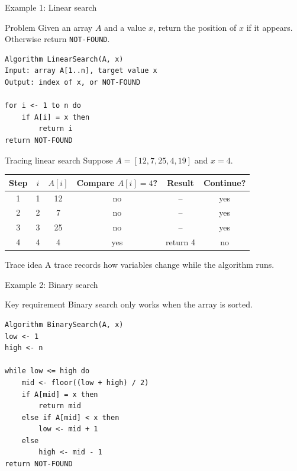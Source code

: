 \documentclass[aspectratio=43,10pt]{beamer}
\begin{document}
\begin{frame}[fragile]{Example 1: Linear search}
\begin{block}{Problem}
Given an array $A$ and a value $x$, return the position of $x$ if it appears. Otherwise return \texttt{NOT-FOUND}.
\end{block}

\begin{lstlisting}[style=pseudo]
Algorithm LinearSearch(A, x)
Input: array A[1..n], target value x
Output: index of x, or NOT-FOUND

for i <- 1 to n do
    if A[i] = x then
        return i
return NOT-FOUND
\end{lstlisting}
\end{frame}

\begin{frame}{Tracing linear search}
  Suppose $A = [12, 7, 25, 4, 19]$ and $x = 4$.

  \vspace{0.6em}
  \begin{center}
  \begin{tabular}{cccccc}
    \toprule
    Step & $i$ & $A[i]$ & Compare $A[i]=4$? & Result & Continue? \\
    \midrule
    1 & 1 & 12 & no & -- & yes \\
    2 & 2 & 7  & no & -- & yes \\
    3 & 3 & 25 & no & -- & yes \\
    4 & 4 & 4  & yes & return 4 & no \\
    \bottomrule
  \end{tabular}
  \end{center}

  \vspace{0.8em}
  \begin{block}{Trace idea}
    A trace records how variables change while the algorithm runs.
  \end{block}
\end{frame}

\begin{frame}[fragile]{Example 2: Binary search}
\begin{block}{Key requirement}
Binary search only works when the array is sorted.
\end{block}

\begin{lstlisting}[style=pseudo,basicstyle=\ttfamily\scriptsize]
Algorithm BinarySearch(A, x)
low <- 1
high <- n

while low <= high do
    mid <- floor((low + high) / 2)
    if A[mid] = x then
        return mid
    else if A[mid] < x then
        low <- mid + 1
    else
        high <- mid - 1
return NOT-FOUND
\end{lstlisting}
\end{frame}
\end{document}
